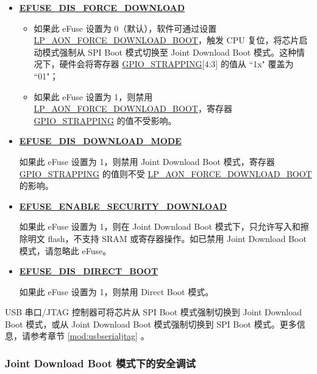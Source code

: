 \documentclass[main\_\_CN.tex]{subfiles}
\begin{document}
\begin{itemize}
    \item \hyperref[fielddesc:EFUSEDISFORCEDOWNLOAD]{\textbf{EFUSE\_DIS\_FORCE\_DOWNLOAD}}
    \begin{itemize}
        \item 如果此 eFuse 设置为 0（默认），软件可通过设置 \hyperref[fielddesc:LPAONFORCEDOWNLOADBOOT]{LP\_AON\_FORCE\_DOWNLOAD\_BOOT}，触发 CPU 复位，将芯片启动模式强制从 SPI Boot 模式切换至 Joint Download Boot 模式。这种情况下，硬件会将寄存器 \hyperref[fielddesc:GPIOSTRAPPING]{GPIO\_STRAPPING}[4:3] 的值从 ``1x" 覆盖为 ``01"；

        \item 如果此 eFuse 设置为 1，则禁用 \hyperref[fielddesc:LPAONFORCEDOWNLOADBOOT]{LP\_AON\_FORCE\_DOWNLOAD\_BOOT}，寄存器 \hyperref[fielddesc:GPIOSTRAPPING]{GPIO\_STRAPPING} 的值不受影响。
    \end{itemize}

    \item \hyperref[fielddesc:EFUSEDISDOWNLOADMODE]{\textbf{EFUSE\_DIS\_DOWNLOAD\_MODE}}

    如果此 eFuse 设置为 1，则禁用 Joint Download Boot 模式，寄存器 \hyperref[fielddesc:GPIOSTRAPPING]{GPIO\_STRAPPING} 的值则不受 \hyperref[fielddesc:LPAONFORCEDOWNLOADBOOT]{LP\_AON\_FORCE\_DOWNLOAD\_BOOT} 的影响。

    \item \hyperref[fielddesc:EFUSEENABLESECURITYDOWNLOAD]{\textbf{EFUSE\_ENABLE\_SECURITY\_DOWNLOAD}}

    如果此 eFuse 设置为 1，则在 Joint Download Boot 模式下，只允许写入和擦除明文 flash，不支持 SRAM 或寄存器操作。如已禁用 Joint Download Boot 模式，请忽略此 eFuse。

    \item \hyperref[fielddesc:EFUSEDISDIRECTBOOT]{\textbf{EFUSE\_DIS\_DIRECT\_BOOT}}

    如果此 eFuse 设置为 1，则禁用 Direct Boot 模式。
\end{itemize}

USB 串口/JTAG 控制器可将芯片从 SPI Boot 模式强制切换到 Joint Download Boot 模式，或从 Joint Download Boot 模式强制切换到 SPI Boot 模式。更多信息，请参考章节 \ref{mod:usbserialjtag} \textit{}。

\subsubsection{Joint Download Boot 模式下的安全调试}
\label{sec:bootctrl-secure-debugging}
\end{document}

